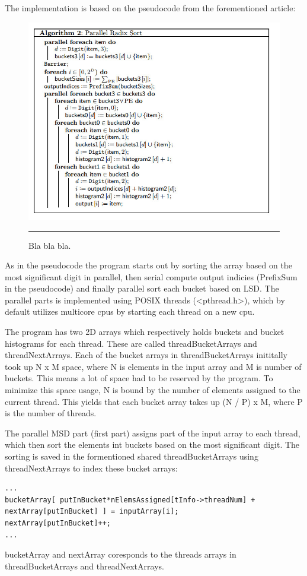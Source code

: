 The implementation is based on the pseudocode from the forementioned article:
\begin{figure}[htbp]
	\centering
		\includegraphics[width=\textwidth]{./Figures/Project2b/MultiCoreRadix_Pseudo.jpg}
		\rule{35em}{0.5pt}
	\caption[Branch misses]{
	Bla bla bla.
	}
	\label{fig:Branch_misses}
\end{figure}
As in the pseudocode the program starts out by sorting the array based on the most significant digit in parallel, then serial compute output indicies (PrefixSum in the pseudocode) and finally parallel sort each bucket based on LSD.  
The parallel parts is implemented using POSIX threads (<pthread.h>), which by default utilizes multicore cpus by starting each thread on a new cpu.

The program has two 2D arrays which respectively holds buckets and bucket histograms for each thread. These are called threadBucketArrays and threadNextArrays.
Each of the bucket arrays in threadBucketArrays inititally took up N x M space, where N is elements in the input array and M is number of buckets.
This means a lot of space had to be reserved by the program. To minimize this space usage, N is bound by the number of elements assigned to the current thread.
This yields that each bucket array takes up (N / P) x M, where P is the number of threads. 

The parallel MSD part (first part) assigns part of the input array to each thread, which then sort the elements int buckets based on the most significant digit.
The sorting is saved in the formentioned shared threadBucketArrays using threadNextArrays to index these bucket arrays:
\begin{lstlisting}
...
bucketArray[ putInBucket*nElemsAssigned[tInfo->threadNum] + nextArray[putInBucket] ] = inputArray[i];
nextArray[putInBucket]++; 
... 
\end{lstlisting}
bucketArray and nextArray coresponds to the threads arrays in threadBucketArrays and threadNextArrays.


